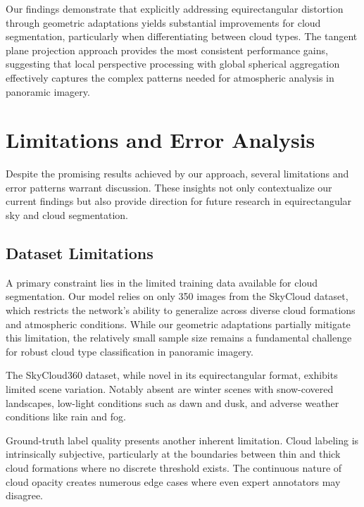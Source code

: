 \documentclass[conference]{IEEEtran}
\begin{document}
Our findings demonstrate that explicitly addressing equirectangular distortion through geometric adaptations yields substantial improvements for cloud segmentation, particularly when differentiating between cloud types.
The tangent plane projection approach provides the most consistent performance gains, suggesting that local perspective processing with global spherical aggregation effectively captures the complex patterns needed for atmospheric analysis in panoramic imagery.



\section{Limitations and Error Analysis}
\label{sec:limitations}

Despite the promising results achieved by our approach, several limitations and error patterns warrant discussion. These insights not only contextualize our current findings but also provide direction for future research in equirectangular sky and cloud segmentation.

\subsection{Dataset Limitations}

A primary constraint lies in the limited training data available for cloud segmentation. Our model relies on only 350 images from the SkyCloud dataset, which restricts the network's ability to generalize across diverse cloud formations and atmospheric conditions. While our geometric adaptations partially mitigate this limitation, the relatively small sample size remains a fundamental challenge for robust cloud type classification in panoramic imagery.

The SkyCloud360 dataset, while novel in its equirectangular format, exhibits limited scene variation. 
Notably absent are winter scenes with snow-covered landscapes, low-light conditions such as dawn and dusk, and adverse weather conditions like rain and fog.

Ground-truth label quality presents another inherent limitation. 
Cloud labeling is intrinsically subjective, particularly at the boundaries between thin and thick cloud formations where no discrete threshold exists. 
The continuous nature of cloud opacity creates numerous edge cases where even expert annotators may disagree. 
\end{document}
